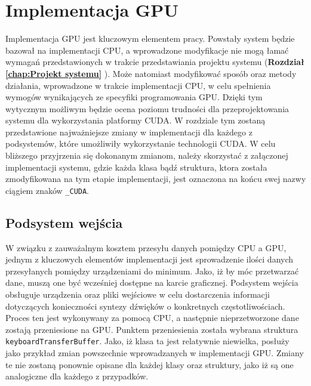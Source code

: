 \chapter{Implementacja GPU}
Implementacja GPU jest kluczowym elementem pracy. Powstały system będzie bazował na implementacji CPU, a wprowadzone modyfikacje nie mogą łamać wymagań przedstawionych w trakcie przedstawiania projektu systemu (\textbf{Rozdział \ref{chap:Projekt systemu} }). Może natomiast modyfikować sposób oraz metody działania, wprowadzone w trakcie implementacji CPU, w celu spełnienia wymogów wynikających ze specyfiki programowania GPU. Dzięki tym wytycznym możliwym będzie ocena poziomu trudności dla przeprojektowania systemu dla wykorzystania platformy CUDA. W rozdziale tym zostaną przedstawione najważniejsze zmiany w implementacji dla każdego z podsystemów, które umożliwiły wykorzystanie technologii CUDA. W celu bliższego przyjrzenia się dokonanym zmianom, należy skorzystać z załączonej implementacji systemu, gdzie każda klasa bądź struktura, ktora została zmodyfikowana na tym etapie implementacji, jest oznaczona na końcu swej nazwy ciągiem znaków \texttt{\_CUDA}.

\section{Podsystem wejścia}
W związku z zauważalnym kosztem przesyłu danych pomiędzy CPU a GPU, jednym z kluczowych elementów implementacji jest sprowadzenie ilości danych przesyłanych pomiędzy urządzeniami do minimum. Jako, iż by móc przetwarzać dane, muszą one być wcześniej dostępne na karcie graficznej. Podsystem wejścia obsługuje urządzenia oraz pliki wejściowe w celu dostarczenia informacji dotyczących konieczności syntezy dźwięków o konkretnych częstotliwościach. Proces ten jest wykonywany za pomocą CPU, a następnie nieprzetworzone dane zostają przeniesione na GPU. Punktem przeniesienia została wybrana struktura \texttt{keyboardTransferBuffer}. Jako, iż klasa ta jest relatywnie niewielka, posłuży jako przykład zmian powszechnie wprowadzanych w implementacji GPU. Zmiany te nie zostaną ponownie opisane dla każdej klasy oraz struktury, jako iż są one analogiczne dla każdego z przypadków.

